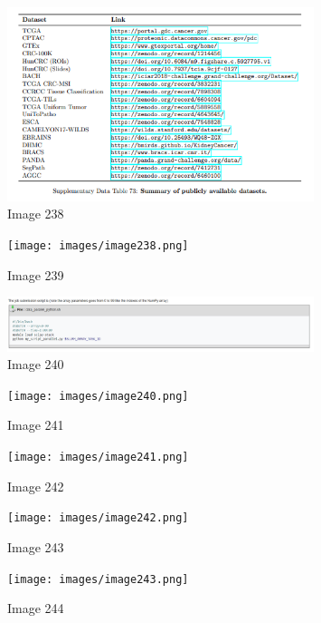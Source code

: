 \documentclass{article}%
\begin{document}
\begin{figure}[h!]%
\centering%
\includegraphics[width=0.8\textwidth]{images/image237.png}%
\caption{Image 238}%
\end{figure}

%


\begin{figure}[h!]%
\centering%
\texttt{[image: images/image238.png]}%
\caption{Image 239}%
\end{figure}

%


\begin{figure}[h!]%
\centering%
\includegraphics[width=0.8\textwidth]{images/image239.png}%
\caption{Image 240}%
\end{figure}

%


\begin{figure}[h!]%
\centering%
\texttt{[image: images/image240.png]}%
\caption{Image 241}%
\end{figure}

%


\begin{figure}[h!]%
\centering%
\texttt{[image: images/image241.png]}%
\caption{Image 242}%
\end{figure}

%


\begin{figure}[h!]%
\centering%
\texttt{[image: images/image242.png]}%
\caption{Image 243}%
\end{figure}

%


\begin{figure}[h!]%
\centering%
\texttt{[image: images/image243.png]}%
\caption{Image 244}%
\end{figure}
\end{document}

